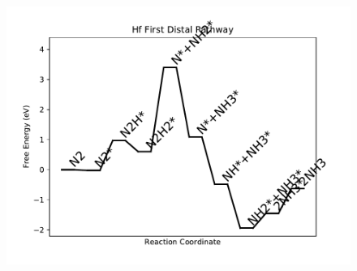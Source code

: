 \begin{figure}
\includegraphics[width=0.8\linewidth]{data/plots/Hf_distal_1.pdf}
\label{fig:Hf_distal_1}
\end{figure}

